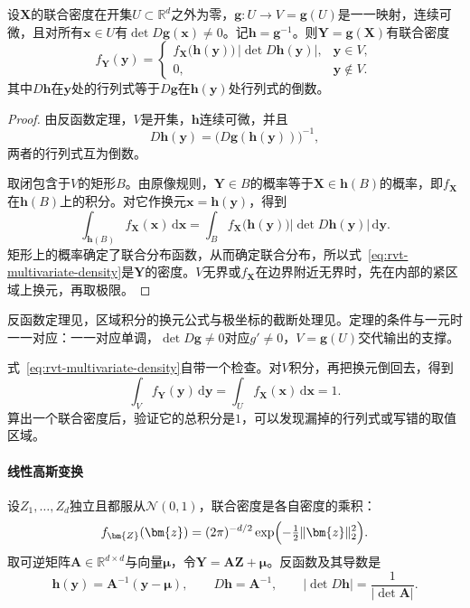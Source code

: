 \begin{theorem}[可逆变换的联合密度]
\label{thm:rvt-multivariate-density}
设$\bm{X}$的联合密度在开集$U\subset\mathbb{R}^{d}$之外为零，$\bm{g}:U\to V=\bm{g}(U)$是一一映射，连续可微，且对所有$\bm{x}\in U$有$\det D\bm{g}(\bm{x})\neq0$。记$\bm{h}=\bm{g}^{-1}$。则$\bm{Y}=\bm{g}(\bm{X})$有联合密度
\begin{equation}
 f_{\bm{Y}}(\bm{y})=
 \begin{cases}
  f_{\bm{X}}\bigl(\bm{h}(\bm{y})\bigr)\,\bigl\lvert\det D\bm{h}(\bm{y})\bigr\rvert, & \bm{y}\in V,\\
  0, & \bm{y}\notin V .
 \end{cases}
 \label{eq:rvt-multivariate-density}
\end{equation}
其中$D\bm{h}$在$\bm{y}$处的行列式等于$D\bm{g}$在$\bm{h}(\bm{y})$处行列式的倒数。
\end{theorem}

\begin{proof}
由反函数定理，$V$是开集，$\bm{h}$连续可微，并且
\[
 D\bm{h}(\bm{y})=\bigl(D\bm{g}(\bm{h}(\bm{y}))\bigr)^{-1} ,
\]
两者的行列式互为倒数。

取闭包含于$V$的矩形$B$。由原像规则，$\bm{Y}\in B$的概率等于$\bm{X}\in\bm{h}(B)$的概率，即$f_{\bm{X}}$在$\bm{h}(B)$上的积分。对它作换元$\bm{x}=\bm{h}(\bm{y})$，得到
\[
 \int_{\bm{h}(B)}f_{\bm{X}}(\bm{x})\,\mathrm{d}\bm{x}=\int_{B}f_{\bm{X}}\bigl(\bm{h}(\bm{y})\bigr)\bigl\lvert\det D\bm{h}(\bm{y})\bigr\rvert\,\mathrm{d}\bm{y} .
\]
矩形上的概率确定了联合分布函数，从而确定联合分布，所以式~\eqref{eq:rvt-multivariate-density}是$\bm{Y}$的密度。$V$无界或$f_{\bm{X}}$在边界附近无界时，先在内部的紧区域上换元，再取极限。
\end{proof}

反函数定理见，区域积分的换元公式与极坐标的截断处理见。定理的条件与一元时一一对应：一一对应单调，$\det D\bm{g}\neq0$对应$g'\neq0$，$V=\bm{g}(U)$交代输出的支撑。

式~\eqref{eq:rvt-multivariate-density}自带一个检查。对$V$积分，再把换元倒回去，得到
\[
 \int_{V}f_{\bm{Y}}(\bm{y})\,\mathrm{d}\bm{y}=\int_{U}f_{\bm{X}}(\bm{x})\,\mathrm{d}\bm{x}=1 .
\]
算出一个联合密度后，验证它的总积分是$1$，可以发现漏掉的行列式或写错的取值区域。

\paragraph{线性高斯变换}
设$Z_1,\ldots,Z_d$独立且都服从$\mathcal{N}(0,1)$，联合密度是各自密度的乘积：
\[
 f_{\bm{Z}}(\bm{z})=(2\pi)^{-d/2}\exp\Bigl(-\tfrac12\lVert\bm{z}\rVert_2^2\Bigr) .
\]
取可逆矩阵$\bm{A}\in\mathbb{R}^{d\times d}$与向量$\bm{\mu}$，令$\bm{Y}=\bm{A}\bm{Z}+\bm{\mu}$。反函数及其导数是
\[
 \bm{h}(\bm{y})=\bm{A}^{-1}(\bm{y}-\bm{\mu}),\qquad D\bm{h}=\bm{A}^{-1},\qquad \lvert\det D\bm{h}\rvert=\frac{1}{\lvert\det\bm{A}\rvert} .
\]


